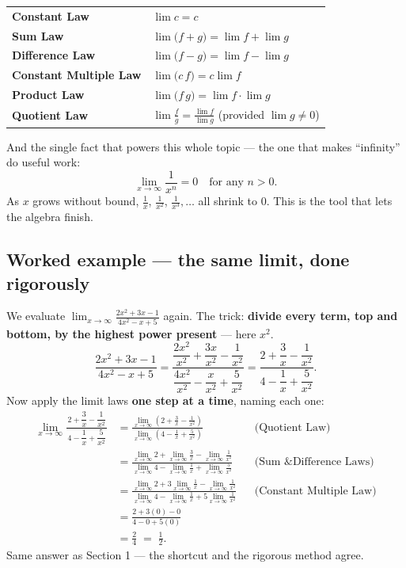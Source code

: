 \documentclass[12pt]{article}
\begin{document}
\medskip
\renewcommand{\arraystretch}{1.5}
\begin{tabular}{@{}p{5.3cm}p{9.5cm}@{}}
\textbf{Constant Law} & $\displaystyle\lim c = c$ \\
\textbf{Sum Law} & $\displaystyle\lim \big(f + g\big) = \lim f + \lim g$ \\
\textbf{Difference Law} & $\displaystyle\lim \big(f - g\big) = \lim f - \lim g$ \\
\textbf{Constant Multiple Law} & $\displaystyle\lim \big(c\,f\big) = c \lim f$ \\
\textbf{Product Law} & $\displaystyle\lim \big(f\,g\big) = \lim f \cdot \lim g$ \\
\textbf{Quotient Law} & $\displaystyle\lim \frac{f}{g} = \frac{\lim f}{\lim g}$ \quad (provided $\lim g \neq 0$) \\
\end{tabular}
\renewcommand{\arraystretch}{1}

\medskip
And the single fact that powers this whole topic --- the one that makes ``infinity'' do useful work:
\[
  \boxed{\;\lim_{x \to \infty} \frac{1}{x^n} = 0 \quad \text{for any } n > 0.\;}
\]
As $x$ grows without bound, $\tfrac1x$, $\tfrac{1}{x^2}$, $\tfrac{1}{x^3}, \dots$ all shrink to $0$. This is the
tool that lets the algebra finish.

\newpage
\subsection*{Worked example --- the same limit, done rigorously}
We evaluate $\displaystyle\lim_{x \to \infty} \frac{2x^2 + 3x - 1}{4x^2 - x + 5}$ again. The trick: \textbf{divide
every term, top and bottom, by the highest power present} --- here $x^2$.
\[
  \frac{2x^2 + 3x - 1}{4x^2 - x + 5}
  = \frac{\dfrac{2x^2}{x^2} + \dfrac{3x}{x^2} - \dfrac{1}{x^2}}
         {\dfrac{4x^2}{x^2} - \dfrac{x}{x^2} + \dfrac{5}{x^2}}
  = \frac{2 + \dfrac{3}{x} - \dfrac{1}{x^2}}{4 - \dfrac{1}{x} + \dfrac{5}{x^2}}.
\]
Now apply the limit laws \textbf{one step at a time}, naming each one:
\begin{align*}
\lim_{x\to\infty}\frac{2+\dfrac{3}{x}-\dfrac{1}{x^2}}{\,4-\dfrac{1}{x}+\dfrac{5}{x^2}\,}
  &= \frac{\displaystyle\lim_{x\to\infty}\!\left(2+\tfrac{3}{x}-\tfrac{1}{x^2}\right)}
          {\displaystyle\lim_{x\to\infty}\!\left(4-\tfrac{1}{x}+\tfrac{5}{x^2}\right)}
     && \text{(Quotient Law)} \\[12pt]
  &= \frac{\displaystyle\lim_{x\to\infty}2+\lim_{x\to\infty}\tfrac{3}{x}-\lim_{x\to\infty}\tfrac{1}{x^2}}
          {\displaystyle\lim_{x\to\infty}4-\lim_{x\to\infty}\tfrac{1}{x}+\lim_{x\to\infty}\tfrac{5}{x^2}}
     && \text{(Sum \& Difference Laws)} \\[12pt]
  &= \frac{\displaystyle\lim_{x\to\infty}2+3\lim_{x\to\infty}\tfrac{1}{x}-\lim_{x\to\infty}\tfrac{1}{x^2}}
          {\displaystyle\lim_{x\to\infty}4-\lim_{x\to\infty}\tfrac{1}{x}+5\lim_{x\to\infty}\tfrac{1}{x^2}}
     && \text{(Constant Multiple Law)} \\[12pt]
  &= \frac{2+3(0)-0}{4-0+5(0)} \\[8pt]
  &= \frac{2}{4} \;=\; \frac{1}{2}.
\end{align*}
Same answer as Section 1 --- the shortcut and the rigorous method agree.
\end{document}
